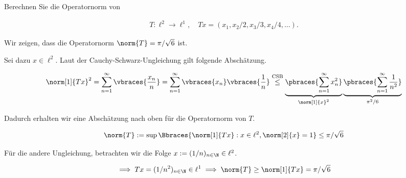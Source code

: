 
\begin{exercise}

Berechnen Sie die Operatornorm von

\begin{align*}
    T: \ell^2 \to \ell^1,
    \quad
    Tx = (x_1, x_2 / 2, x_3 / 3, x_4 / 4, \ldots).
\end{align*}

\end{exercise}


\begin{solution}

Wir zeigen, dass die Operatornorm $\norm{T} = \pi / \sqrt{6}$ ist.

Sei dazu $x \in \ell^2$.
Laut der Cauchy-Schwarz-Ungleichung gilt folgende Abschätzung.

\begin{align*}
    \norm[1]{Tx}^2
    =
    \sum_{n=1}^\infty
    \vbraces
    {
        \frac{x_n}{n}
    }
    =
    \sum_{n=1}^\infty
    \vbraces{x_n}
    \vbraces
    {
        \frac{1}{n}
    }
    \stackrel{\text{CSB}}{\leq}
    \underbrace
    {
        \pbraces
        {
            \sum_{n=1}^\infty
            x_n^2
        }
    }_{
        \norm[1]{x}^2
    }
    \underbrace
    {
        \pbraces
        {
            \sum_{n=1}^\infty
            \frac{1}{n^2}
        }
    }_{
        \pi^2 / 6
    }
\end{align*}

Dadurch erhalten wir eine Abschätzung nach oben für die Operatornorm von $T$.

\begin{align*}
    \norm{T}
    :=
    \sup
    \Bbraces
    {
        \norm[1]{Tx}:
        x \in \ell^2,
        \norm[2]{x} = 1
    }
    \leq
    \pi / \sqrt{6}
\end{align*}

Für die andere Ungleichung, betrachten wir die Folge $x := (1/n)_{n \in \N} \in \ell^2$.

\begin{align*}
    \implies
    Tx = (1/n^2)_{n \in \N} \in \ell^1
    \implies
    \norm{T} \geq \norm[1]{Tx} = \pi / \sqrt{6}
\end{align*}

\end{solution}

